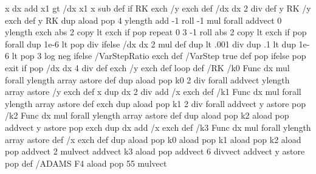 {{{          x dx add x1 gt { /dx x1 x sub def } if
          RK %
          exch /y exch def /dx dx 2 div def
          { %
            y RK %
            /y exch def y RK %
            dup aload pop 4 ylength add -1 roll
            { -1 mul } forall addvect 0 ylength { exch abs 2 copy lt { exch } if pop } repeat
            0 3 -1 roll {abs 2 copy lt { exch } if pop } forall
            dup 1e-6 lt { pop } { div } ifelse
            /dx dx 2 mul def
            dup \psk@varsteptol\space lt
            { .001 div dup .1 lt
              { dup 1e-6 lt { pop 3 } { log neg } ifelse /VarStepRatio exch def /VarStep true def }
              { pop } ifelse pop exit } if
            pop /dx dx 4 div def exch /y exch def } loop
        } def
      \else			%
        /RK {
           /k0 Func { dx mul } forall ylength array astore def 				%
           dup aload pop k0 { 2 div } forall addvect ylength array astore /y exch def %
           x dup dx 2 div add /x exch def 						%
           /k1 Func { dx mul } forall ylength array astore def 				%
           exch dup aload pop k1 { 2 div } forall addvect y astore pop 			%
           /k2 Func { dx mul } forall ylength array astore def 				%
           dup aload pop k2 aload pop addvect y astore pop exch dup dx add /x exch def 	%
           /k3 Func { dx mul } forall ylength array astore def %
           /x exch def 									%
           dup aload pop k0 aload pop k1 aload pop k2 aload pop addvect
           2 mulvect addvect k3 aload pop addvect
           6 divvect addvect y astore pop
        } def
        \ifx\psk@method\@adams
           /ADAMS {
             \ifcase\psk@adamsorder
             \or{}
             \or{}
             \or{}
             \or
               F4 aload pop  55 mulvect
}}}
